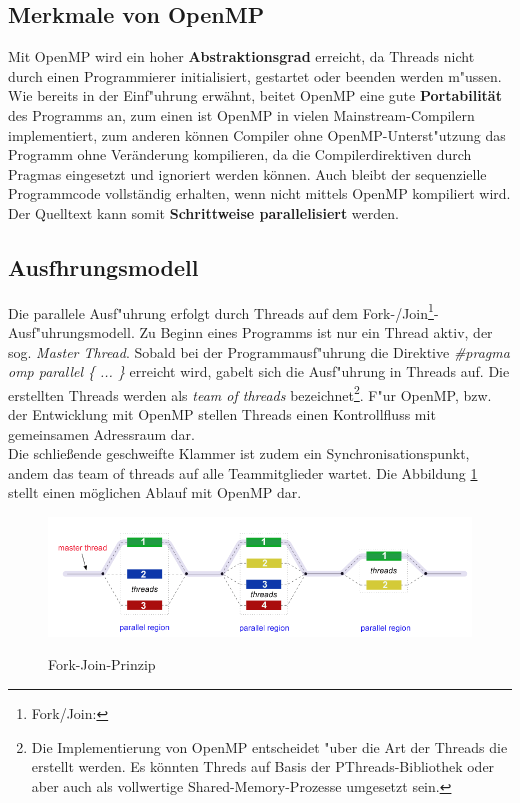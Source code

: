 \documentclass[11pt]{scrartcl}
\begin{document}
\subsection{Merkmale von OpenMP}

Mit OpenMP wird ein hoher \textbf{Abstraktionsgrad} erreicht, da Threads nicht durch einen
Programmierer initialisiert, gestartet oder beenden werden m"ussen. Wie bereits in der
Einf"uhrung erwähnt, beitet OpenMP eine gute \textbf{Portabilität} des Programms an, zum
einen ist OpenMP in vielen Mainstream-Compilern implementiert, zum anderen können Compiler
ohne OpenMP-Unterst"utzung das Programm ohne Veränderung kompilieren, da die
Compilerdirektiven durch Pragmas eingesetzt und ignoriert werden können. Auch bleibt der
sequenzielle Programmcode vollständig erhalten, wenn nicht mittels OpenMP kompiliert wird.
Der Quelltext kann somit \textbf{Schrittweise parallelisiert} werden. \\

\subsection{Ausfhrungsmodell} Die parallele Ausf"uhrung erfolgt durch Threads auf dem
Fork-/Join\footnote{Fork/Join:}-Ausf"uhrungsmodell. Zu Beginn eines Programms ist nur ein
Thread aktiv, der sog. \textit{Master Thread}. Sobald bei der Programmausf"uhrung die
Direktive \textit{\#pragma omp parallel \{ ... \} } erreicht wird, gabelt sich die
Ausf"uhrung in Threads auf. Die erstellten Threads werden als \textit{team of threads}
bezeichnet\footnote{Die Implementierung von OpenMP entscheidet "uber die Art der Threads
die erstellt werden. Es könnten Threds auf Basis der PThreads-Bibliothek oder aber auch
als vollwertige Shared-Memory-Prozesse umgesetzt sein.}. F"ur OpenMP, bzw. der Entwicklung
mit OpenMP stellen Threads einen Kontrollfluss mit gemeinsamen Adressraum dar.  \\ Die
schließende geschweifte Klammer ist zudem ein Synchronisationspunkt, andem das team of
threads auf alle Teammitglieder wartet. Die Abbildung \ref{Join-Fork-Modell} stellt einen
möglichen Ablauf mit OpenMP dar.

\begin{figure}[h!]
\centering
\includegraphics[width=1.0\textwidth]{img/fork_join.png}
\label{Join-Fork-Modell}
\caption{Fork-Join-Prinzip}
\end{figure}
\end{document}

